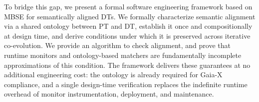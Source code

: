 %
%



To bridge this gap, we present a formal software engineering framework based on MBSE for semantically aligned DTs. We formally characterize semantic alignment via a shared ontology between PT and DT, establish it once and compositionally at design time, and derive conditions under which it is preserved across iterative co-evolution. We provide an algorithm to check alignment, and prove that runtime monitors and ontology-based matchers are fundamentally incomplete approximations of this condition.  The framework delivers these guarantees at no additional engineering cost: the ontology is already required for Gaia-X compliance, and a single design-time verification replaces the indefinite runtime overhead of monitor instrumentation, deployment, and maintenance.


